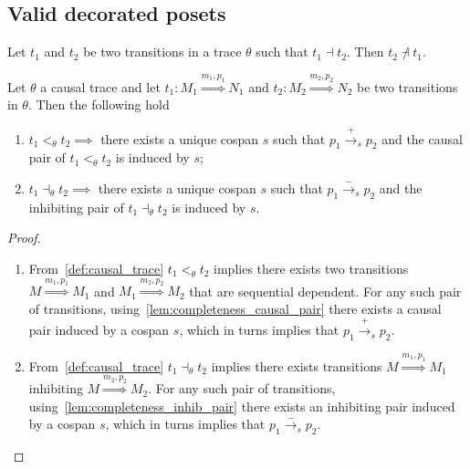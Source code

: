 \subsection{Valid decorated posets}
\label{sec:valid_decor}

\begin{lemma}
  \label{lem:inhibiting_pair}
  Let $t_1$ and $t_2$ be two transitions in a trace $\theta$ such that $t_1\dashv t_2$. Then $t_2\not\dashv t_1$.
\end{lemma}

\begin{lemma}
  \label{lemma:pos_infl}
  Let $\theta$ a causal trace and let $t_1:M_1\overset{m_1,p_1}{\Rightarrow}N_1$ and $t_2:M_2\overset{m_2,p_2}{\Rightarrow}N_2$ be two transitions in $\theta$. Then the following hold
  \begin{enumerate}
  \item $t_1 <_{\theta} t_2\implies$ there exists a unique cospan $s$ such that $p_1\xrightarrow{+}_s p_2$ and the causal pair of $t_1 <_{\theta} t_2$ is induced by $s$;
  \item $t_1\dashv_{\theta} t_2\implies$ there exists a unique cospan $s$ such that $p_1\xrightarrow{-}_s p_2$ and the inhibiting pair of $t_1\dashv_{\theta} t_2$ is induced by $s$.
  \end{enumerate}
\end{lemma}
\begin{proof}
  \begin{enumerate}
  \item From~\autoref{def:causal_trace} $t_1 <_{\theta} t_2$ implies there exists two transitions $M\overset{m_1,p_1}{\Rightarrow} M_1$ and $M_1\overset{m_2,p_2}{\Rightarrow} M_2$ that are sequential dependent. For any such pair of transitions, using~\autoref{lem:completeness_causal_pair} there exists a causal pair induced by a cospan $s$, which in turns implies that $p_1\xrightarrow{+}_{s}p_2$.

  \item From~\autoref{def:causal_trace} $t_1 \dashv_{\theta} t_2$ implies there exists transitions $M\overset{m_1,p_1}{\Rightarrow} M_1$ inhibiting $M\overset{m_2,p_2}{\Rightarrow} M_2$. For any such pair of transitions, using~\autoref{lem:completeness_inhib_pair} there exists an inhibiting pair induced by a cospan $s$, which in turns implies that $p_1\xrightarrow{-}_s p_2$.
  \end{enumerate}
\end{proof}

